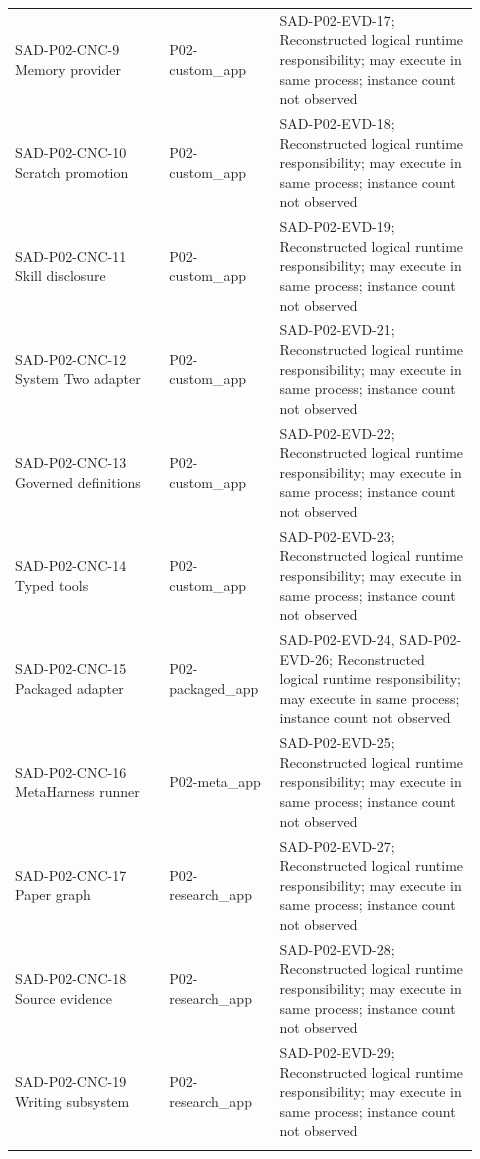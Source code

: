 \documentclass[10pt,letterpaper]{article}
\begin{document}
\begin{longtable}{@{}>{\raggedright\arraybackslash}p{0.31\linewidth}>{\raggedright\arraybackslash}p{0.21\linewidth}>{\raggedright\arraybackslash}p{0.4\linewidth}@{}}
SAD-P02-CNC-9 Memory provider & P02-custom\_app & SAD-P02-EVD-17; Reconstructed logical runtime responsibility; may execute in same process; instance count not observed\\\addlinespace
SAD-P02-CNC-10 Scratch promotion & P02-custom\_app & SAD-P02-EVD-18; Reconstructed logical runtime responsibility; may execute in same process; instance count not observed\\\addlinespace
SAD-P02-CNC-11 Skill disclosure & P02-custom\_app & SAD-P02-EVD-19; Reconstructed logical runtime responsibility; may execute in same process; instance count not observed\\\addlinespace
SAD-P02-CNC-12 System Two adapter & P02-custom\_app & SAD-P02-EVD-21; Reconstructed logical runtime responsibility; may execute in same process; instance count not observed\\\addlinespace
SAD-P02-CNC-13 Governed definitions & P02-custom\_app & SAD-P02-EVD-22; Reconstructed logical runtime responsibility; may execute in same process; instance count not observed\\\addlinespace
SAD-P02-CNC-14 Typed tools & P02-custom\_app & SAD-P02-EVD-23; Reconstructed logical runtime responsibility; may execute in same process; instance count not observed\\\addlinespace
SAD-P02-CNC-15 Packaged adapter & P02-packaged\_app & SAD-P02-EVD-24, SAD-P02-EVD-26; Reconstructed logical runtime responsibility; may execute in same process; instance count not observed\\\addlinespace
SAD-P02-CNC-16 MetaHarness runner & P02-meta\_app & SAD-P02-EVD-25; Reconstructed logical runtime responsibility; may execute in same process; instance count not observed\\\addlinespace
SAD-P02-CNC-17 Paper graph & P02-research\_app & SAD-P02-EVD-27; Reconstructed logical runtime responsibility; may execute in same process; instance count not observed\\\addlinespace
SAD-P02-CNC-18 Source evidence & P02-research\_app & SAD-P02-EVD-28; Reconstructed logical runtime responsibility; may execute in same process; instance count not observed\\\addlinespace
SAD-P02-CNC-19 Writing subsystem & P02-research\_app & SAD-P02-EVD-29; Reconstructed logical runtime responsibility; may execute in same process; instance count not observed\\\addlinespace
\bottomrule\end{longtable}
\end{document}
